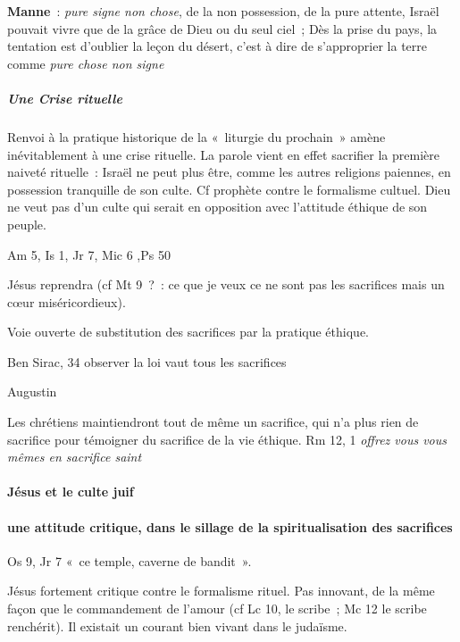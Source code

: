 \textbf{Manne}~: \emph{pure signe non chose}, de la non possession, de
la pure attente, Israël pouvait vivre que de la grâce de Dieu ou du seul
ciel~; Dès la prise du pays, la tentation est d'oublier la leçon du
désert, c'est à dire de s'approprier la terre comme \emph{pure chose non
signe}

\hypertarget{une-crise-rituelle}{%
\subparagraph{Une Crise rituelle}\label{une-crise-rituelle}}

Renvoi à la pratique historique de la «~liturgie du prochain~» amène
inévitablement à une crise rituelle. La parole vient en effet sacrifier
la première naiveté rituelle~: Israël ne peut plus être, comme les
autres religions paiennes, en possession tranquille de son culte. Cf
prophète contre le formalisme cultuel. Dieu ne veut pas d'un culte qui
serait en opposition avec l'attitude éthique de son peuple.

Am 5, Is 1, Jr 7, Mic 6 ,Ps 50

Jésus reprendra (cf Mt 9~?~: ce que je veux ce ne sont pas les
sacrifices mais un cœur miséricordieux).

Voie ouverte de substitution des sacrifices par la pratique éthique.

 
Ben Sirac, 34 observer la loi vaut tous les sacrifices

Augustin

Les chrétiens maintiendront tout de même un sacrifice, qui n'a plus rien
de sacrifice pour témoigner du sacrifice de la vie éthique. Rm 12, 1
\emph{offrez vous vous mêmes en sacrifice saint}
 

\hypertarget{juxe9sus-et-le-culte-juif}{%
\paragraph{Jésus et le culte
juif}\label{juxe9sus-et-le-culte-juif}}

\hypertarget{a.-une-attitude-critique-dans-le-sillage-de-la-spiritualisation-des-sacrifices}{%
\paragraph{une attitude critique, dans le sillage de la
spiritualisation des
sacrifices}\label{a.-une-attitude-critique-dans-le-sillage-de-la-spiritualisation-des-sacrifices}}

Os 9, Jr 7 «~ce temple, caverne de bandit~».

Jésus fortement critique contre le formalisme rituel. Pas innovant, de
la même façon que le commandement de l'amour (cf Lc 10, le scribe~; Mc
12 le scribe renchérit). Il existait un courant bien vivant dans le
judaïsme.

